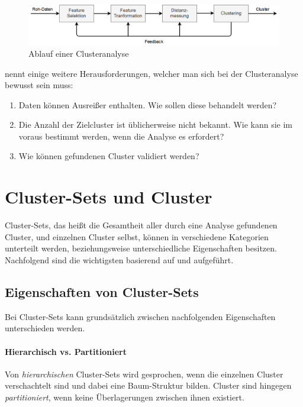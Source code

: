 \begin{figure}[H]
    \centering
    \includegraphics[width=\linewidth]{resources/img/grundlagen/clustering_flow}
    \caption{Ablauf einer Clusteranalyse}
    \label{fig:grund_clustering_workflow}
\end{figure}

\cite[]{Jain2010} nennt einige weitere Herausforderungen, welcher man sich bei der Clusteranalyse bewusst sein muss:

\begin{enumerate}
    \item Daten können Ausreißer enthalten. Wie sollen diese behandelt werden?
    \item Die Anzahl der Zielcluster ist üblicherweise nicht bekannt. Wie kann sie im voraus bestimmt werden, wenn die Analyse es erfordert?
    \item Wie können gefundenen Cluster validiert werden?
\end{enumerate}

\section{Cluster-Sets und Cluster}

Cluster-Sets, das heißt die Gesamtheit aller durch eine Analyse gefundenen Cluster, und einzelnen Cluster selbst,
können in verschiedene Kategorien unterteilt werden, beziehungsweise unterschiedliche Eigenschaften besitzen.
Nachfolgend sind die wichtigsten basierend auf \cite[]{tan2007introduction} und \cite[]{Jain1999,Jain2010} aufgeführt.

\subsection{Eigenschaften von Cluster-Sets}

Bei Cluster-Sets kann grundsätzlich zwischen nachfolgenden Eigenschaften unterschieden werden.

\paragraph{Hierarchisch vs. Partitioniert}
Von \textit{hierarchischen} Cluster-Sets wird gesprochen, wenn die einzelnen Cluster verschachtelt sind und dabei eine
Baum-Struktur bilden. Cluster sind hingegen \textit{partitioniert}, wenn keine Überlagerungen zwischen ihnen existiert.

